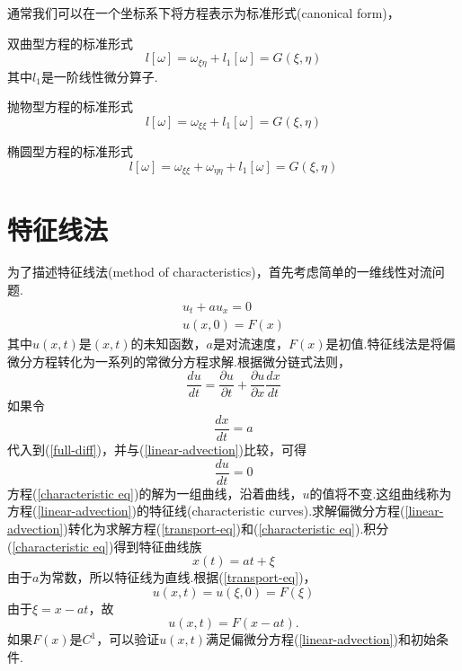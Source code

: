 通常我们可以在一个坐标系下将方程表示为标准形式(canonical form)，
\begin{mydef}
	双曲型方程的标准形式
	\begin{equation}
		l[\omega]=\omega_{\xi\eta}+l_1[\omega] = G(\xi,\eta)
	\end{equation}
	其中$l_1$是一阶线性微分算子.
\end{mydef}
\begin{mydef}
	抛物型方程的标准形式
	\begin{equation}
		l[\omega]=\omega_{\xi\xi}+l_1[\omega] = G(\xi,\eta)
	\end{equation}
\end{mydef}

\begin{mydef}
	椭圆型方程的标准形式
	\begin{equation}
	l[\omega]=\omega_{\xi\xi}+\omega_{\eta\eta}+l_1[\omega] = G(\xi,\eta)
	\end{equation}
\end{mydef}
\section{特征线法}
为了描述特征线法(method of characteristics)，首先考虑简单的一维线性对流问题.
\begin{subequations}
	\begin{align}
	u_t + au_x  =  0  \label{linear-advection}\\
	u(x,0)  =  F(x)
	\end{align}
\end{subequations}
其中$u(x,t)$是$(x,t)$的未知函数，$a$是对流速度，$F(x)$是初值.特征线法是将偏微分方程转化为一系列的常微分方程求解.根据微分链式法则，
\begin{equation} \label{full-diff}
	\frac{du}{dt}=\frac{\partial u}{\partial t} + \frac{\partial u}{\partial x} \frac{dx}{dt}
\end{equation}
如果令
\begin{equation} \label{characteristic eq}
	\frac{dx}{dt} = a
\end{equation}
代入到(\ref{full-diff})，并与(\ref{linear-advection})比较，可得
\begin{equation} \label{transport-eq}
	\frac{du}{dt} = 0
\end{equation}
方程(\ref{characteristic eq})的解为一组曲线，沿着曲线，$u$的值将不变.这组曲线称为方程(\ref{linear-advection})的特征线(characteristic curves).求解偏微分方程(\ref{linear-advection})转化为求解方程(\ref{transport-eq})和(\ref{characteristic eq}).积分(\ref{characteristic eq})得到特征曲线族
\begin{equation}
	x(t) = at + \xi
\end{equation}
由于$a$为常数，所以特征线为直线.根据(\ref{transport-eq})，
\begin{equation}
	u(x,t) = u(\xi,0)=F(\xi)
\end{equation}
由于$\xi=x-at$，故
\begin{equation}
	u(x,t)=F(x-at).
\end{equation}
如果$F(x)$是$C^1$，可以验证$u(x,t)$满足偏微分方程(\ref{linear-advection})和初始条件.

